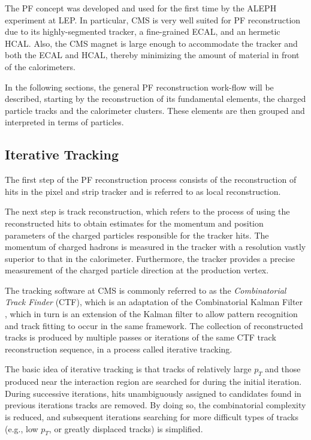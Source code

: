 The PF concept was developed and used for the first time by the ALEPH experiment at LEP\cite{BUSKULIC1995481}. In particular, CMS is very well suited for PF reconstruction due to its highly-segmented tracker,  a fine-grained ECAL, and an hermetic HCAL. Also, the CMS magnet is large enough to accommodate the tracker and both the ECAL and HCAL, thereby minimizing the amount of material in front of the calorimeters.


In the following sections, the general PF reconstruction work-flow will be described, starting by the reconstruction of its fundamental elements, the charged particle tracks and the calorimeter clusters. These elements are then grouped and interpreted in terms of particles.

\subsection{Iterative Tracking}

The first step of the PF reconstruction process consists of the reconstruction of hits in the pixel and strip tracker\cite{TRK-11-001} and is referred to as local reconstruction.

The next step is track reconstruction, which refers to the process of using the reconstructed hits to obtain estimates for the momentum and position parameters of the charged particles responsible for the tracker hits. The momentum of charged hadrons is measured in the tracker with a resolution vastly superior to that in the calorimeter. Furthermore, the tracker provides a precise measurement of the charged particle direction at the production vertex. 

The tracking software at CMS\cite{TRK-11-001} is commonly referred to as the \textit{Combinatorial Track Finder} (CTF), which is an adaptation of the Combinatorial Kalman Filter \cite{Billoir:1989mh,BILLOIR1990219,Mankel:1997dy}, which in turn is an extension of the Kalman filter\cite{Fruhwirth:1987fm} to allow pattern recognition and track fitting to occur in the same framework. The collection of reconstructed tracks is produced by multiple passes or iterations of the same CTF track reconstruction sequence, in a process called iterative tracking. 

The basic idea of iterative tracking is that tracks of relatively large $p_{T}$ and those produced near the interaction region are searched for during the initial iteration. During successive iterations, hits unambiguously assigned to candidates found in previous iterations tracks are removed. By doing so, the combinatorial complexity is reduced, and subsequent iterations searching for more difficult types of tracks (e.g., low $p_{T}$, or greatly displaced tracks) is simplified.

